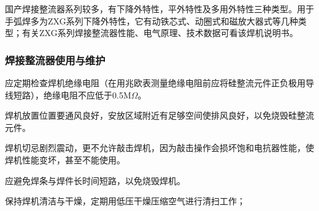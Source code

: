 \documentclass{ctexbook}
\begin{document}
国产焊接整流器系列较多，有下降外特性，平外特性及多用外特性三种类型。用于手弧焊多为ZXG系列下降外特性，它有动铁芯式、动圈式和磁放大器式等几种类型；有关ZXG系列焊接整流器性能、电气原理、技术数据可看该焊机说明书。
\subsubsection{焊接整流器使用与维护}
应定期检查焊机绝缘电阻（在用兆欧表测量绝缘电阻前应将硅整流元件正负极用导线短路），绝缘电阻不应低于0.5M$\Omega$。

焊机放置位置要通风良好，安放区域附近有足够空间使排风良好，以免烧毁硅整流元件。

焊机切忌剧烈震动，更不允许敲击焊机，因为敲击操作会损坏饱和电抗器性能，使焊机性能变坏，甚至不能使用。

应避免焊条与焊件长时间短路，以免烧毁焊机。

保持焊机清洁与干燥，定期用低压干燥压缩空气进行清扫工作；
\end{document}
